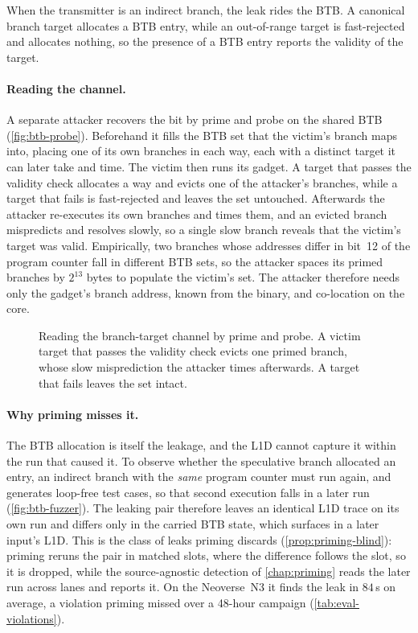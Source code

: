 When the transmitter is an indirect branch, the leak rides the BTB. A canonical branch target
allocates a BTB entry, while an out-of-range target is fast-rejected and allocates nothing, so the
presence of a BTB entry reports the validity of the target.

\paragraph{Reading the channel.}
A separate attacker recovers the bit by prime and probe on the shared BTB
(\autoref{fig:btb-probe}). Beforehand it fills the BTB set that the victim's branch maps into,
placing one of its own branches in each way, each with a distinct target it can later take and time.
The victim then runs its gadget. A target that passes the validity check allocates a way and evicts
one of the attacker's branches, while a target that fails is fast-rejected and leaves the set
untouched. Afterwards the attacker re-executes its own branches and times them, and an evicted
branch mispredicts and resolves slowly, so a single slow branch reveals that the victim's target was
valid. Empirically, two branches whose addresses differ in bit~12 of the program counter fall in different
BTB sets, so the attacker spaces its primed branches by $2^{13}$ bytes to populate the victim's set.
The attacker therefore needs only the gadget's branch address, known from the binary, and
co-location on the core.

\begin{figure}[t]
\centering
\fitwidth{}
\caption{Reading the branch-target channel by prime and probe. A victim target that passes the
validity check evicts one primed branch, whose slow misprediction the attacker times afterwards. A
target that fails leaves the set intact.}
\label{fig:btb-probe}
\end{figure}

\paragraph{Why priming misses it.}
The BTB allocation is itself the leakage, and the L1D cannot capture it within the run that caused
it. To observe whether the speculative branch allocated an entry, an indirect branch with the
\emph{same} program counter must run again, and \revizor{} generates loop-free test cases, so that
second execution falls in a later run (\autoref{fig:btb-fuzzer}). The leaking pair therefore leaves
an identical L1D trace on its own run and differs only in the carried BTB state, which surfaces in a
later input's L1D. This is the class of leaks priming discards (\autoref{prop:priming-blind}):
priming reruns the pair in matched slots, where the difference follows the slot, so it is dropped,
while the source-agnostic detection of \autoref{chap:priming} reads the later run across lanes and
reports it. On the Neoverse~N3 it finds the leak in $84$\,s on average, a violation priming missed
over a 48-hour campaign (\autoref{tab:eval-violations}).

